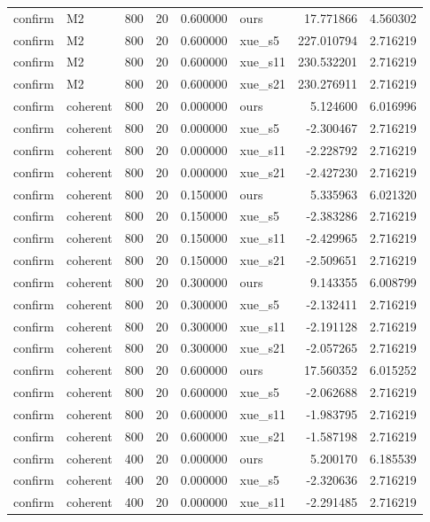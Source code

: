 \begin{longtable}{llrrrlrr}
confirm & M2 & 800 & 20 & 0.600000 & ours & 17.771866 & 4.560302 \\
confirm & M2 & 800 & 20 & 0.600000 & xue\_s5 & 227.010794 & 2.716219 \\
confirm & M2 & 800 & 20 & 0.600000 & xue\_s11 & 230.532201 & 2.716219 \\
confirm & M2 & 800 & 20 & 0.600000 & xue\_s21 & 230.276911 & 2.716219 \\
confirm & coherent & 800 & 20 & 0.000000 & ours & 5.124600 & 6.016996 \\
confirm & coherent & 800 & 20 & 0.000000 & xue\_s5 & -2.300467 & 2.716219 \\
confirm & coherent & 800 & 20 & 0.000000 & xue\_s11 & -2.228792 & 2.716219 \\
confirm & coherent & 800 & 20 & 0.000000 & xue\_s21 & -2.427230 & 2.716219 \\
confirm & coherent & 800 & 20 & 0.150000 & ours & 5.335963 & 6.021320 \\
confirm & coherent & 800 & 20 & 0.150000 & xue\_s5 & -2.383286 & 2.716219 \\
confirm & coherent & 800 & 20 & 0.150000 & xue\_s11 & -2.429965 & 2.716219 \\
confirm & coherent & 800 & 20 & 0.150000 & xue\_s21 & -2.509651 & 2.716219 \\
confirm & coherent & 800 & 20 & 0.300000 & ours & 9.143355 & 6.008799 \\
confirm & coherent & 800 & 20 & 0.300000 & xue\_s5 & -2.132411 & 2.716219 \\
confirm & coherent & 800 & 20 & 0.300000 & xue\_s11 & -2.191128 & 2.716219 \\
confirm & coherent & 800 & 20 & 0.300000 & xue\_s21 & -2.057265 & 2.716219 \\
confirm & coherent & 800 & 20 & 0.600000 & ours & 17.560352 & 6.015252 \\
confirm & coherent & 800 & 20 & 0.600000 & xue\_s5 & -2.062688 & 2.716219 \\
confirm & coherent & 800 & 20 & 0.600000 & xue\_s11 & -1.983795 & 2.716219 \\
confirm & coherent & 800 & 20 & 0.600000 & xue\_s21 & -1.587198 & 2.716219 \\
confirm & coherent & 400 & 20 & 0.000000 & ours & 5.200170 & 6.185539 \\
confirm & coherent & 400 & 20 & 0.000000 & xue\_s5 & -2.320636 & 2.716219 \\
confirm & coherent & 400 & 20 & 0.000000 & xue\_s11 & -2.291485 & 2.716219 \\

\end{longtable}
